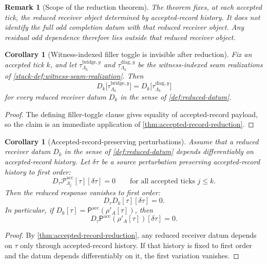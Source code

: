 \documentclass[11pt]{article}
\newtheorem{corollary}[theorem]{Corollary}
\newtheorem{remark}[theorem]{Remark}
\theoremstyle{definition}
\newcommand{\Pacc}{\mathsf P^{\mathrm{acc}}}
\begin{document}
\begin{remark}[Scope of the reduction theorem]
\label{rem:accepted-record-reduction-physical}
The theorem fixes, at each accepted tick, the reduced receiver object determined by accepted-record
history.
It does \emph{not} identify the full odd completion datum with that reduced receiver object.
Any residual odd dependence therefore lies outside that reduced receiver object.
\end{remark}

\begin{corollary}[Witness-indexed filler toggle is invisible after reduction]
\label{cor:filler-toggle-invisible}
Fix an accepted tick \(k\), and let
\(
\tau^{\mathrm{bridge},y}_{\Lambda_k}
\)
and
\(
\tau^{\mathrm{diag},y}_{\Lambda_k}
\)
be the witness-indexed seam realizations of \cref{stack-def:witness-seam-realization}.
Then
\[
D_k\!\big[\tau^{\mathrm{bridge},y}_{\Lambda_k}\big]
=
D_k\!\big[\tau^{\mathrm{diag},y}_{\Lambda_k}\big]
\]
for every reduced receiver datum \(D_k\) in the sense of \cref{def:reduced-datum}.
\end{corollary}

\begin{proof}
The defining filler-toggle clause gives equality of accepted-record payload, so the claim is an
immediate application of \cref{thm:accepted-record-reduction}.
\end{proof}

\begin{corollary}[Accepted-record-preserving perturbations]
\label{cor:conditional-differential}
Assume that a reduced receiver datum \(D_k\) in the sense of \cref{def:reduced-datum} depends
differentiably on accepted-record history.
Let \(\delta \tau\) be a source perturbation preserving accepted-record history to first order:
\[
D_\tau \mathcal P^{\mathrm{acc}}_{\Lambda_j}[\tau][\delta\tau]=0
\qquad
\text{for all accepted ticks } j \le k.
\]
Then the reduced response vanishes to first order:
\[
D_\tau D_k[\tau][\delta\tau]=0.
\]
In particular, if \(D_k[\tau]=\Pacc(\rho'_A[\tau])\), then
\[
D_\tau \Pacc(\rho'_A[\tau])[\delta\tau]=0.
\]
\end{corollary}

\begin{proof}
By \cref{thm:accepted-record-reduction}, any reduced receiver datum depends on \(\tau\) only through
accepted-record history.
If that history is fixed to first order and the datum depends differentiably on it, the first
variation vanishes.
\end{proof}
\end{document}
